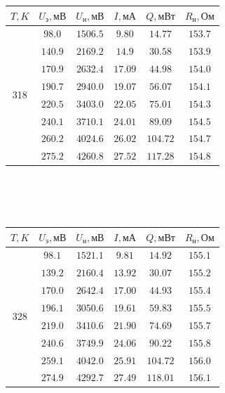 \documentclass[20pt]{article}
\begin{document}
\begin{tabular}{|c|c|c|c|c|c|}
\hline $T, K$ & $U_\text{э}, \text{мВ}$ & $U_{\text{н}}, \text{мВ}$ & $I, \text{мА}$ & $Q, \text{мВт}$ & $R_{\text{н}}, \text{Ом}$ \\\hline
\multirow{8}{*}{318}
 & $98.0$ & $1506.5$ & $9.80$ & $14.77$ & $153.7$ \\\cline{2-6}
 & $140.9$ & $2169.2$ & $14.9$ & $30.58$ & $153.9$ \\\cline{2-6}
 & $170.9$ & $2632.4$ & $17.09$ & $44.98$ & $154.0$ \\\cline{2-6}
 & $190.7$ & $2940.0$ & $19.07$ & $56.07$ & $154.1$ \\\cline{2-6}
 & $220.5$ & $3403.0$ & $22.05$ & $75.01$ & $154.3$ \\\cline{2-6}
 & $240.1$ & $3710.1$ & $24.01$ & $89.09$ & $154.5$ \\\cline{2-6}
 & $260.2$ & $4024.6$ & $26.02$ & $104.72$ & $154.7$ \\\cline{2-6}
 & $275.2$ & $4260.8$ & $27.52$ & $117.28$ & $154.8$ \\\hline
\end{tabular} \\\\\\
\begin{tabular}{|c|c|c|c|c|c|}
\hline $T, K$ & $U_\text{э}, \text{мВ}$ & $U_{\text{н}}, \text{мВ}$ & $I, \text{мА}$ & $Q, \text{мВт}$ & $R_{\text{н}}, \text{Ом}$ \\\hline
\multirow{8}{*}{328}
 & $98.1$ & $1521.1$ & $9.81$ & $14.92$ & $155.1$ \\\cline{2-6}
 & $139.2$ & $2160.4$ & $13.92$ & $30.07$ & $155.2$ \\\cline{2-6}
 & $170.0$ & $2642.4$ & $17.00$ & $44.93$ & $155.4$ \\\cline{2-6}
 & $196.1$ & $3050.6$ & $19.61$ & $59.83$ & $155.5$ \\\cline{2-6}
 & $219.0$ & $3410.6$ & $21.90$ & $74.69$ & $155.7$ \\\cline{2-6}
 & $240.6$ & $3749.9$ & $24.06$ & $90.22$ & $155.8$ \\\cline{2-6}
 & $259.1$ & $4042.0$ & $25.91$ & $104.72$ & $156.0$ \\\cline{2-6}
 & $274.9$ & $4292.7$ & $27.49$ & $118.01$ & $156.1$ \\\hline
\end{tabular} \\\\\\
\end{document}
